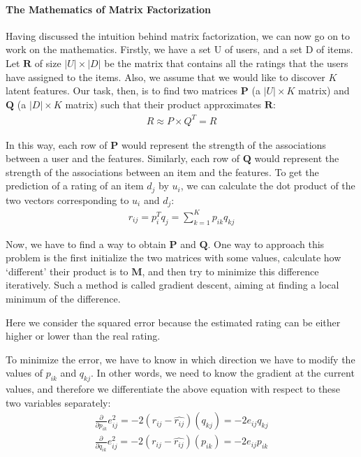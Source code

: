 \paragraph{The Mathematics of Matrix Factorization}

 Having discussed the intuition behind matrix factorization, we can now go on to work on the mathematics. Firstly, we have a set U of users, and a set D of items. Let $\mathbf{R}$ of size $|U| \times |D|$ be the matrix that contains all the ratings that the users have assigned to the items. Also, we assume that we would like to discover $K$ latent features. Our task, then, is to find two matrices $\mathbf{P}$ (a $|U| \times K$ matrix) and $\mathbf{Q}$ (a $|D| \times K$ matrix) such that their product approximates $\mathbf{R}$:
  \begin{gather*}
    R \approx P \times Q^{T} = \widehat{R}
  \end{gather*}

 In this way, each row of $\mathbf{P}$ would represent the strength of the associations between a user and the features. Similarly, each row of $\mathbf{Q}$ would represent the strength of the associations between an item and the features. To get the prediction of a rating of an item $d_j$ by $u_i$, we can calculate the dot product of the two vectors corresponding to $u_i$ and $d_j$:
  \begin{gather*}
    r_{ij} = p_i^{T}q_j = \sum_{k=1}^{K}p_{ik}q_{kj}
  \end{gather*}

 Now, we have to find a way to obtain $\mathbf{P}$ and $\mathbf{Q}$. One way to approach this problem is the first initialize the two matrices with some values, calculate how `different’ their product is to $\mathbf{M}$, and then try to minimize this difference iteratively. Such a method is called gradient descent, aiming at finding a local minimum of the difference.

 Here we consider the squared error because the estimated rating can be either higher or lower than the real rating.

 To minimize the error, we have to know in which direction we have to modify the values of $p_{ik}$ and $q_{kj}$. In other words, we need to know the gradient at the current values, and therefore we differentiate the above equation with respect to these two variables separately:
	\begin{gather*}
      \frac{\partial}{\partial p_{ik}}e_{ij}^2 = -2(r_{ij} - \widehat{r_{ij}})(q_{kj}) = -2e_{ij}q_{kj} \\
      \frac{\partial}{\partial q_{ik}}e_{ij}^2 = -2(r_{ij} - \widehat{r_{ij}})(p_{ik}) = -2e_{ij}p_{ik}
  \end{gather*}

